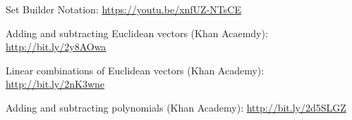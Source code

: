 \begin{readinessAssuranceResources}
\item Set Builder Notation:
		\url{https://youtu.be/xnfUZ-NTsCE}
\item Adding and subtracting Euclidean vectors (Khan Acaemdy):
      \url{http://bit.ly/2y8AOwa}
\item Linear combinations of Euclidean vectors (Khan Academy):
      \url{http://bit.ly/2nK3wne}
\item Adding and subtracting polynomials (Khan Academy):
      \url{http://bit.ly/2d5SLGZ}
\end{readinessAssuranceResources}

